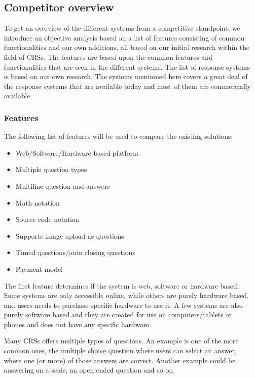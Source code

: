 \subsection{Competitor overview}\label{sec:competitor-overview}
To get an overview of the different systems from a competitive standpoint, we introduce an objective analysis based on a list of features consisting of common functionalities and our own additions, all based on our initial research within the field of CRSs. The features are based upon the common features and functionalities that are seen in the different systems. The list of response systems is based on our own research. The systems mentioned here covers a great deal of the response systems that are available today and most of them are commercially available.

\subsubsection*{Features}
The following list of features will be used to compare the existing solutions.

\begin{itemize}
    \setlength\itemsep{0em}
    \item Web/Software/Hardware based platform
    \item Multiple question types
    \item Multiline question and answers
    \item Math notation
    \item Source code notation
    \item Supports image upload as questions
    \item Timed questions/auto closing questions
    \item Payment model
\end{itemize}

The first feature determines if the system is web, software or hardware based. Some systems are only accessible online, while others are purely hardware based, and users needs to purchase specific hardware to use it. A few systems are also purely software based and they are created for use on computers/tablets or phones and does not have any specific hardware.

Many CRSs offers multiple types of questions. An example is one of the more common ones,  the multiple choice question where users can select an answer, where one (or more) of those answers are correct. Another example could be answering on a scale, an open ended question and so on.

